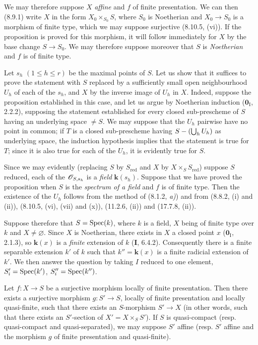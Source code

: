 We may therefore suppose $X$ \emph{affine} and $f$ of finite presentation. We can then (8.9.1) write $X$ in the form $X_0\times_{S_0}S$, where $S_0$ is Noetherian and $X_0\to S_0$ is a morphism of finite type, which we may suppose surjective (8.10.5, (vi)). If the proposition is proved for this morphism, it will follow immediately for $X$ by the base change $S\to S_0$. We may therefore suppose moreover that $S$ is \emph{Noetherian} and $f$ is of finite type.

Let $s_h$ $(1\leq h\leq r)$ be the maximal points of $S$. Let us show that it suffices to prove the statement with $S$ replaced by a sufficiently small open neighbourhood $U_h$ of each of the $s_h$, and $X$ by the inverse image of $U_h$ in $X$. Indeed, suppose the proposition established in this case, and let us argue by Noetherian induction ($\mathbf{0}_{\mathrm I}$, 2.2.2), supposing the statement established for every closed sub-prescheme of $S$ having an underlying space $\neq S$. We may suppose that the $U_h$ pairwise have no point in common; if $T$ is a closed sub-prescheme having $S-(\bigcup_h U_h)$ as underlying space, the induction hypothesis implies that the statement is true for $T$; since it is also true for each of the $U_h$, it is evidently true for $S$.

Since we may evidently (replacing $S$ by $S_{\mathrm{red}}$ and $X$ by $X\times_S S_{\mathrm{red}}$) suppose $S$ reduced, each of the $\mathscr{O}_{S,s_h}$ is a \emph{field} $\boldsymbol{k}(s_h)$. Suppose that we have proved the proposition when $S$ is the \emph{spectrum of a field} and $f$ is of finite type. Then the existence of the $U_h$ follows from the method of (8.1.2, \emph{a)}) and from (8.8.2, (i) and (ii)), (8.10.5, (vi), (vii) and (x)), (11.2.6, (ii)) and (17.7.8, (ii)).

Suppose therefore that $S=\operatorname{Spec}(k)$, where $k$ is a field, $X$ being of finite type over $k$ and $X\neq\varnothing$. Since $X$ is Noetherian, there exists in $X$ a closed point $x$ ($\mathbf{0}_{\mathrm I}$, 2.1.3), so $\boldsymbol{k}(x)$ is a \emph{finite} extension of $k$ (\textbf{I}, 6.4.2). Consequently there is a finite separable extension $k'$ of $k$ such that $k''=\boldsymbol{k}(x)$ is a finite radicial extension of $k'$. We then answer the question by taking $I$ reduced to one element, $S_i'=\operatorname{Spec}(k')$, $S_i''=\operatorname{Spec}(k'')$.


\begin{corollary}[17.16.5]
\label{IV.17.16.5}
Let $f:X\to S$ be a surjective morphism locally of finite presentation. Then there exists a surjective morphism $g:S'\to S$, locally of finite presentation and \textup{locally quasi-finite}, such that there exists an $S$-morphism $S'\to X$ \textup{(in other words, such that there exists an} $S'$-section \textup{of} $X'=X\times_S S'$\textup{)}. If $S$ is quasi-compact \textup{(resp.} quasi-compact and quasi-separated\textup{)}, we may suppose $S'$ affine \textup{(resp.} $S'$ affine and the morphism $g$ of finite presentation and quasi-finite\textup{)}.
\end{corollary}

